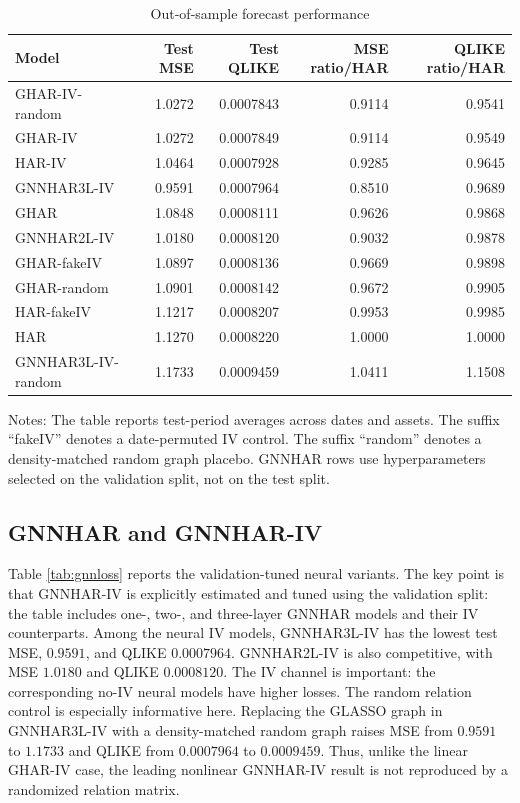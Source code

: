 \documentclass[11pt,a4paper]{article}
\begin{document}
\begin{table}[t]
\centering
\caption{Out-of-sample forecast performance}
\label{tab:mainloss}
\begin{threeparttable}
\begin{tabular}{lrrrr}
\toprule
Model & Test MSE & Test QLIKE & MSE ratio/HAR & QLIKE ratio/HAR \\
\midrule
GHAR-IV-random & 1.0272 & 0.0007843 & 0.9114 & 0.9541 \\
GHAR-IV & 1.0272 & 0.0007849 & 0.9114 & 0.9549 \\
HAR-IV & 1.0464 & 0.0007928 & 0.9285 & 0.9645 \\
GNNHAR3L-IV & 0.9591 & 0.0007964 & 0.8510 & 0.9689 \\
GHAR & 1.0848 & 0.0008111 & 0.9626 & 0.9868 \\
GNNHAR2L-IV & 1.0180 & 0.0008120 & 0.9032 & 0.9878 \\
GHAR-fakeIV & 1.0897 & 0.0008136 & 0.9669 & 0.9898 \\
GHAR-random & 1.0901 & 0.0008142 & 0.9672 & 0.9905 \\
HAR-fakeIV & 1.1217 & 0.0008207 & 0.9953 & 0.9985 \\
HAR & 1.1270 & 0.0008220 & 1.0000 & 1.0000 \\
GNNHAR3L-IV-random & 1.1733 & 0.0009459 & 1.0411 & 1.1508 \\
\bottomrule
\end{tabular}
\begin{tablenotes}
\footnotesize
\item Notes: The table reports test-period averages across dates and assets. The suffix ``fakeIV''
denotes a date-permuted IV control. The suffix ``random'' denotes a density-matched random
graph placebo. GNNHAR rows use hyperparameters selected on the validation split, not on the
test split.
\end{tablenotes}
\end{threeparttable}
\end{table}

\subsection{GNNHAR and GNNHAR-IV}

Table \ref{tab:gnnloss} reports the validation-tuned neural variants. The key point is that
GNNHAR-IV is explicitly estimated and tuned using the validation split: the table includes
one-, two-, and three-layer GNNHAR models and their IV counterparts. Among the neural IV
models, GNNHAR3L-IV has the lowest test MSE, \(0.9591\), and QLIKE \(0.0007964\).
GNNHAR2L-IV is also competitive, with MSE \(1.0180\) and QLIKE \(0.0008120\). The IV
channel is important: the corresponding no-IV neural models have higher losses. The random
relation control is especially informative here. Replacing the GLASSO graph in GNNHAR3L-IV
with a density-matched random graph raises MSE from \(0.9591\) to \(1.1733\) and QLIKE from
\(0.0007964\) to \(0.0009459\). Thus, unlike the linear GHAR-IV case, the leading nonlinear
GNNHAR-IV result is not reproduced by a randomized relation matrix.
\end{document}
